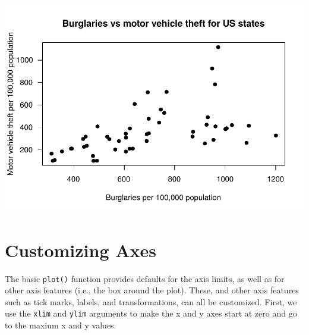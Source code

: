 \documentclass[
]{krantz}
\makeatletter
\newenvironment{Shaded}{\begin{snugshade}}{\end{snugshade}}
\newcommand{\DataTypeTok}[1]{\textcolor[rgb]{0.27,0.27,0.27}{#1}}
\newcommand{\DecValTok}[1]{\textcolor[rgb]{0.06,0.06,0.06}{#1}}
\newcommand{\KeywordTok}[1]{\textcolor[rgb]{0.27,0.27,0.27}{\textbf{#1}}}
\newcommand{\NormalTok}[1]{#1}
\newcommand{\OperatorTok}[1]{\textcolor[rgb]{0.43,0.43,0.43}{\textbf{#1}}}
\newcommand{\StringTok}[1]{\textcolor[rgb]{0.5,0.5,0.5}{#1}}
\newenvironment{kframe}{%
\medskip{}
\setlength{\fboxsep}{.8em}
 \def\at@end@of@kframe{}%
 \ifinner\ifhmode%
  \def\at@end@of@kframe{\end{minipage}}%
  \begin{minipage}{\columnwidth}%
 \fi\fi%
 \def\FrameCommand##1{\hskip\@totalleftmargin \hskip-\fboxsep
 \colorbox{shadecolor}{##1}\hskip-\fboxsep
     \hskip-\linewidth \hskip-\@totalleftmargin \hskip\columnwidth}%
 \MakeFramed {\advance\hsize-\width
   \@totalleftmargin\z@ \linewidth\hsize
   \@setminipage}}%
 {\par\unskip\endMakeFramed%
 \at@end@of@kframe}
\renewenvironment{Shaded}{\begin{kframe}}{\end{kframe}}
\makeatother
\begin{document}
\includegraphics{bookdown_files/figure-latex/unnamed-chunk-345-1.pdf}

\hypertarget{customizing-axes-1}{%
\section{Customizing Axes}\label{customizing-axes-1}}

The basic \texttt{plot()} function provides defaults for the axis limits, as well as for other axis features (i.e., the box around the plot). These, and other axis features such as tick marks, labels, and transformations, can all be customized. First, we use the \texttt{xlim} and \texttt{ylim} arguments to make the x and y axes start at zero and go to the maxium x and y values.

\begin{Shaded}
\end{Shaded}
\end{document}
